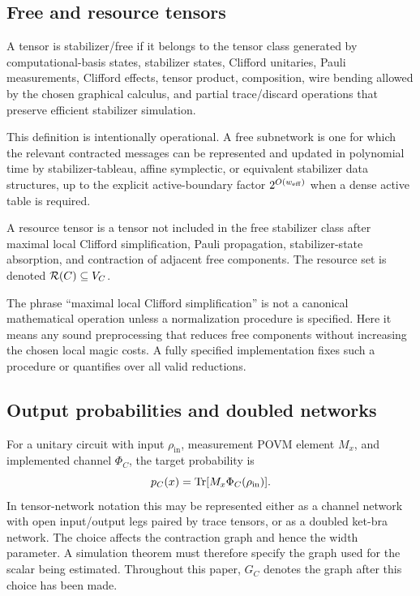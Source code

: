 \subsection{Free and resource tensors}

\begin{definition}
A tensor is stabilizer/free if it belongs to the tensor class generated by computational-basis states, stabilizer states, Clifford unitaries, Pauli measurements, Clifford effects, tensor product, composition, wire bending allowed by the chosen graphical calculus, and partial trace/discard operations that preserve efficient stabilizer simulation.
\end{definition}

This definition is intentionally operational. A free subnetwork is one for which the relevant contracted messages can be represented and updated in polynomial time by stabilizer-tableau, affine symplectic, or equivalent stabilizer data structures, up to the explicit active-boundary factor \(2^{O(w_{\mathrm{eff}})}\) when a dense active table is required.

\begin{definition}
A resource tensor is a tensor not included in the free stabilizer class after maximal local Clifford simplification, Pauli propagation, stabilizer-state absorption, and contraction of adjacent free components. The resource set is denoted \(\mathcal{R}(C)\subseteq V_C\).
\end{definition}

The phrase ``maximal local Clifford simplification'' is not a canonical mathematical operation unless a normalization procedure is specified. Here it means any sound preprocessing that reduces free components without increasing the chosen local magic costs. A fully specified implementation fixes such a procedure or quantifies over all valid reductions.

\subsection{Output probabilities and doubled networks}

For a unitary circuit with input \(\rho_{\mathrm{in}}\), measurement POVM element \(M_x\), and implemented channel \(\Phi_C\), the target probability is
\[
p_C(x)=\operatorname{Tr}[M_x\Phi_C(\rho_{\mathrm{in}})].
\]
In tensor-network notation this may be represented either as a channel network with open input/output legs paired by trace tensors, or as a doubled ket-bra network. The choice affects the contraction graph and hence the width parameter. A simulation theorem must therefore specify the graph used for the scalar being estimated. Throughout this paper, \(G_C\) denotes the graph after this choice has been made.

